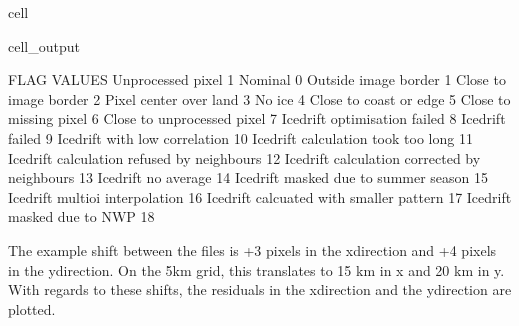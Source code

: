\documentclass[letterpaper,10pt,english]{jupyterBook}
\begin{document}
\begin{sphinxuseclass}{cell}
\begin{sphinxVerbatimOutput}
\begin{sphinxuseclass}{cell_output}
\noindent{}

\begin{sphinxVerbatim}[commandchars=\\\{\}]
FLAG VALUES 
Unprocessed pixel                              \PYGZhy{}1
Nominal                                        0
Outside image border                           1
Close to image border                          2
Pixel center over land                         3
No ice                                         4
Close to coast or edge                         5
Close to missing pixel                         6
Close to unprocessed pixel                     7
Icedrift optimisation failed                   8
Icedrift failed                                9
Icedrift with low correlation                  10
Icedrift calculation took too long             11
Icedrift calculation refused by neighbours     12
Icedrift calculation corrected by neighbours   13
Icedrift no average                            14
Icedrift masked due to summer season           15
Icedrift multi\PYGZhy{}oi interpolation                16
Icedrift calcuated with smaller pattern        17
Icedrift masked due to NWP                     18
\end{sphinxVerbatim}

\end{sphinxuseclass}\end{sphinxVerbatimOutput}

\end{sphinxuseclass}
\sphinxAtStartPar
The example shift between the files is +3 pixels in the x\sphinxhyphen{}direction and +4 pixels in the y\sphinxhyphen{}direction. On the 5km grid, this translates to 15 km in x and 20 km in y. With regards to these shifts, the residuals in the x\sphinxhyphen{}direction and the y\sphinxhyphen{}direction are plotted.
\end{document}
